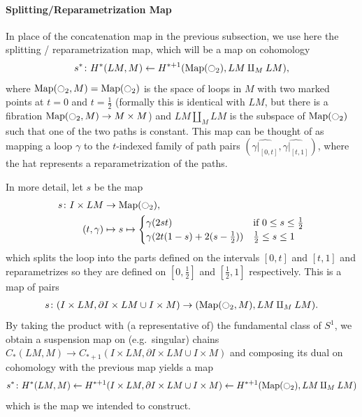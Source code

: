 \documentclass{scrartcl}
\theoremstyle{plain}
\theoremstyle{definition}
\newcommand{\union}{\mathbin{\cup}}
\newcommand{\from}{\leftarrow}
\DeclareMathOperator{\Map}{Map}
\renewcommand{\coprod}{\mathbin{\amalg}}
\begin{document}
\paragraph{Splitting/Reparametrization Map} In place of the concatenation map in the previous subsection, we use here the splitting / reparametrization map, which will be a map on cohomology
\begin{align*}
    s^*\colon H^{*}(LM, M) \from H^{*+1}(\Map(\ocircle_2), LM\coprod_M LM),
\end{align*}
where $\Map(\ocircle_2, M) = \Map(\ocircle_2)$ is the space of loops in $M$ with two marked points at $t=0$ and $t=\frac 12$ (formally this is identical with $LM$, but there is a fibration $\Map(\ocircle_2, M)\to M\times M$) and $LM\coprod_M LM$ is the subspace of $\Map(\ocircle_2)$ such that one of the two paths is constant. This map can be thought of as mapping a loop $\gamma$ to the $t$-indexed family of path pairs $(\widehat{\gamma|_{[0, t]}}, \widehat{\gamma|_{[t, 1]}})$, where the hat represents a reparametrization of the paths. 

In more detail, let $s$ be the map 
\begin{align*}
    s\colon I\times LM & \to\Map(\ocircle_2),\\
    (t, \gamma) &\mapsto s\mapsto \begin{cases}
        \gamma(2 st) & \text{if}\ 0 \leq s \leq \frac 12\\
        \gamma(2t(1-s)+2(s-\frac 12))& \frac 12\leq s \leq 1
    \end{cases}
\end{align*}
which splits the loop into the parts defined on the intervals $[0, t]$ and $[t, 1]$ and reparametrizes so they are defined on $[0, \frac 12]$ and $[\frac 12, 1]$ respectively. This is a map of pairs
\begin{align*}
    s\colon (I\times LM, \partial I\times LM \union I\times M) \to (\Map(\ocircle_2, M), LM\coprod_M LM).
\end{align*} 
By taking the product with (a representative of) the fundamental class of $S^1$, we obtain a suspension map on (e.g.\ singular) chains $ C_{*}(LM, M) \to C_{*+1}(I\times LM, \partial I \times LM \union I\times M)$ and composing its dual on cohomology with the previous map yields a map 
\begin{align*}
    s^*\colon H^{*}(LM, M) \from H^{*+1}(I\times LM, \partial I \times LM \union I\times M) \from H^{*+1}(\Map(\ocircle_2), LM\coprod_M LM)
\end{align*}
which is the map we intended to construct.
\end{document}
